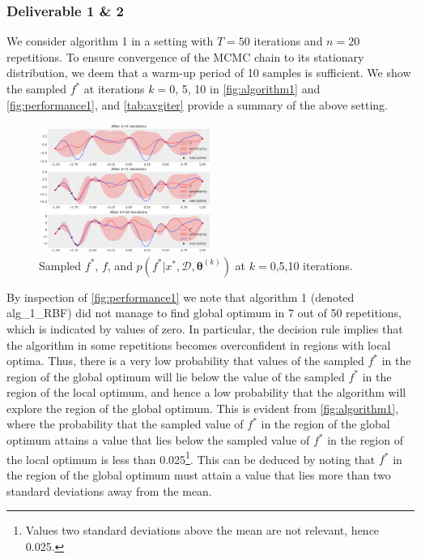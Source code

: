 \subsubsection*{Deliverable 1 \& 2}
We consider algorithm 1 in a setting with $T=50$ iterations and $n=20$ repetitions. To ensure convergence of the MCMC chain to its stationary distribution, we deem that a warm-up period of 10 samples is sufficient. We show the sampled $f^*$ at iterations $k=$0, 5, 10 in \autoref{fig:algorithm1} and \autoref{fig:performance1}, and \autoref{tab:avgiter} provide a summary of the above setting.

\begin{figure}[H]
    \centering
    \includegraphics[width=0.5\textwidth]{src/algorithm1plot.png}
    \caption{Sampled $f^*$, $f$, and  $p(f^*|x^*,\mathcal{D}, \bm{\theta}^{(k)})$ at $k=$0,5,10 iterations.}
    \label{fig:algorithm1}
\end{figure}
By inspection of \autoref{fig:performance1} we note that algorithm 1 (denoted alg\_1\_RBF) did not manage to find global optimum in 7 out of 50 repetitions, which is indicated by values of zero. In particular, the decision rule implies that the algorithm in some repetitions becomes overconfident in regions with local optima. Thus, there is a very low probability that values of the sampled $f^*$ in the region of the global optimum will lie below the value of the sampled $f^*$ in the region of the local optimum, and hence a low probability that the algorithm will explore the region of the global optimum. This is evident from \autoref{fig:algorithm1}, where the probability that the sampled value of $f^*$ in the region of the global optimum attains a value that lies below the sampled value of $f^*$ in the region of the local optimum is less than 0.025\footnote{Values two standard deviations above the mean are not relevant, hence 0.025.}. This can be deduced by noting that $f^*$ in the region of the global optimum must attain a value that lies more than two standard deviations away from the mean. 

